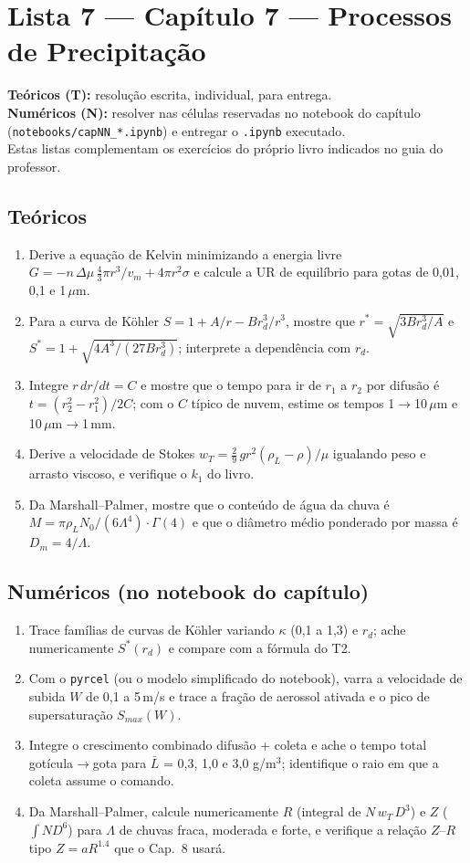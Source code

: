 \documentclass[11pt]{article}
\newcommand{\instrucoes}{%
\begin{caixalista}
\textbf{Teóricos (T):} resolução escrita, individual, para entrega.\\
\textbf{Numéricos (N):} resolver nas células reservadas no notebook do
capítulo (\texttt{notebooks/capNN\_*.ipynb}) e entregar o
\texttt{.ipynb} executado.\\
Estas listas complementam os exercícios do próprio livro indicados no
guia do professor.
\end{caixalista}}
\begin{document}
\clearpage
\section*{Lista 7 --- Capítulo 7 --- Processos de Precipitação}
\instrucoes

\subsection*{Teóricos}

\begin{enumerate}[label=\textbf{T\arabic*.},itemsep=4pt]
  \item Derive a equação de Kelvin minimizando a energia livre
        $G = -n\,\Delta\mu\,\tfrac43\pi r^3/v_m + 4\pi r^2\sigma$ e
        calcule a UR de equilíbrio para gotas de 0{,}01, 0{,}1 e
        1\,$\mu$m.
  \item Para a curva de Köhler $S = 1 + A/r - Br_d^3/r^3$, mostre que
        $r^* = \sqrt{3Br_d^3/A}$ e $S^* = 1 + \sqrt{4A^3/(27Br_d^3)}$;
        interprete a dependência com $r_d$.
  \item Integre $r\,dr/dt = C$ e mostre que o tempo para ir de $r_1$ a
        $r_2$ por difusão é $t = (r_2^2 - r_1^2)/2C$; com o $C$ típico
        de nuvem, estime os tempos 1$\to$10\,$\mu$m e
        10\,$\mu$m$\to$1\,mm.
  \item Derive a velocidade de Stokes
        $w_T = \tfrac{2}{9}\,g r^2(\rho_L-\rho)/\mu$ igualando peso e
        arrasto viscoso, e verifique o $k_1$ do livro.
  \item Da Marshall--Palmer, mostre que o conteúdo de água da chuva é
        $M = \pi\rho_L N_0/(6\Lambda^4)\cdot\Gamma(4)$ e que o diâmetro
        médio ponderado por massa é $D_m = 4/\Lambda$.
\end{enumerate}

\subsection*{Numéricos (no notebook do capítulo)}

\begin{enumerate}[label=\textbf{N\arabic*.},itemsep=4pt]
  \item Trace famílias de curvas de Köhler variando $\kappa$ (0{,}1 a
        1{,}3) e $r_d$; ache numericamente $S^*(r_d)$ e compare com a
        fórmula do T2.
  \item Com o \texttt{pyrcel} (ou o modelo simplificado do notebook),
        varra a velocidade de subida $W$ de 0{,}1 a 5\,m/s e trace a
        fração de aerossol ativada e o pico de supersaturação
        $S_{max}(W)$.
  \item Integre o crescimento combinado difusão + coleta e ache o tempo
        total gotícula$\to$gota para $\bar L$ = 0{,}3, 1{,}0 e 3{,}0
        g/m$^3$; identifique o raio em que a coleta assume o comando.
  \item Da Marshall--Palmer, calcule numericamente $R$ (integral de
        $N\,w_T\,D^3$) e $Z$ ($\int N D^6$) para $\Lambda$ de chuvas
        fraca, moderada e forte, e verifique a relação $Z$--$R$ tipo
        $Z = a R^{1.4}$ que o Cap.~8 usará.
\end{enumerate}
\end{document}
